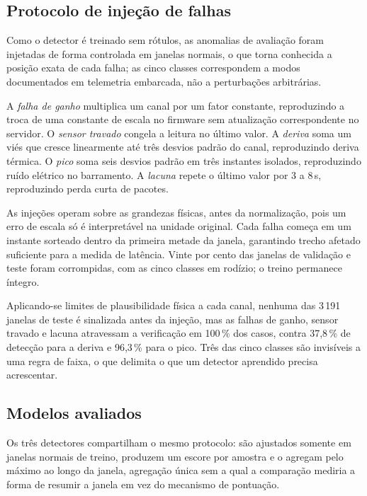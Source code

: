\documentclass[conference]{IEEEtran}
\begin{document}
\subsection{Protocolo de injeção de falhas}

Como o detector é treinado sem rótulos, as anomalias de avaliação foram injetadas de forma controlada em janelas normais, o que torna conhecida a posição exata de cada falha; as cinco classes correspondem a modos documentados em telemetria embarcada, não a perturbações arbitrárias.

A \emph{falha de ganho} multiplica um canal por um fator constante, reproduzindo a troca de uma constante de escala no firmware sem atualização correspondente no servidor.
O \emph{sensor travado} congela a leitura no último valor.
A \emph{deriva} soma um viés que cresce linearmente até três desvios padrão do canal, reproduzindo deriva térmica.
O \emph{pico} soma seis desvios padrão em três instantes isolados, reproduzindo ruído elétrico no barramento.
A \emph{lacuna} repete o último valor por 3 a 8\,s, reproduzindo perda curta de pacotes.

As injeções operam sobre as grandezas físicas, antes da normalização, pois um erro de escala só é interpretável na unidade original.
Cada falha começa em um instante sorteado dentro da primeira metade da janela, garantindo trecho afetado suficiente para a medida de latência.
Vinte por cento das janelas de validação e teste foram corrompidas, com as cinco classes em rodízio; o treino permanece íntegro.

Aplicando-se limites de plausibilidade física a cada canal, nenhuma das 3\,191 janelas de teste é sinalizada antes da injeção, mas as falhas de ganho, sensor travado e lacuna atravessam a verificação em 100\,\% dos casos, contra 37,8\,\% de detecção para a deriva e 96,3\,\% para o pico.
Três das cinco classes são invisíveis a uma regra de faixa, o que delimita o que um detector aprendido precisa acrescentar.

\subsection{Modelos avaliados}

Os três detectores compartilham o mesmo protocolo: são ajustados somente em janelas normais de treino, produzem um escore por amostra e o agregam pelo máximo ao longo da janela, agregação única sem a qual a comparação mediria a forma de resumir a janela em vez do mecanismo de pontuação.
\end{document}
